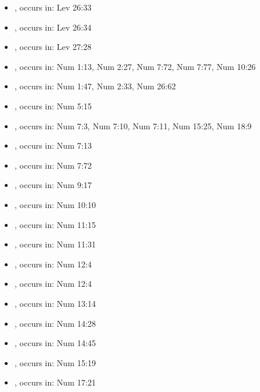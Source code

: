 \documentclass[14pt]{article}
\begin{document}
\begin{itemize}
\item {}, occurs in: Lev 26:33

\item {}, occurs in: Lev 26:34

\item {}, occurs in: Lev 27:28

\item {}, occurs in: Num 1:13, Num 2:27, Num 7:72, Num 7:77, Num 10:26

\item {}, occurs in: Num 1:47, Num 2:33, Num 26:62

\item {}, occurs in: Num 5:15

\item {}, occurs in: Num 7:3, Num 7:10, Num 7:11, Num 15:25, Num 18:9

\item {}, occurs in: Num 7:13

\item {}, occurs in: Num 7:72

\item {}, occurs in: Num 9:17

\item {}, occurs in: Num 10:10

\item {}, occurs in: Num 11:15

\item {}, occurs in: Num 11:31

\item {}, occurs in: Num 12:4

\item {}, occurs in: Num 12:4

\item {}, occurs in: Num 13:14

\item {}, occurs in: Num 14:28

\item {}, occurs in: Num 14:45

\item {}, occurs in: Num 15:19

\item {}, occurs in: Num 17:21


\end{itemize}
\end{document}

